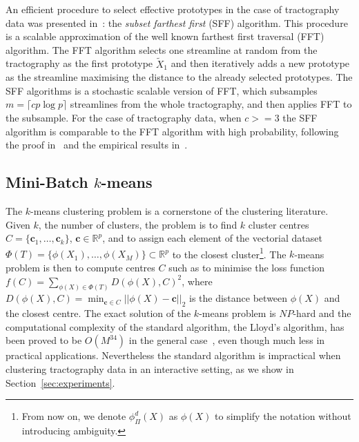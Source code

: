 An efficient procedure to select effective prototypes in the case of
tractography data was presented in~\cite{olivetti2012approximation}:
the \emph{subset farthest first} (SFF) algorithm. This procedure is a
scalable approximation of the well known farthest first traversal
(FFT) algorithm.
The FFT algorithm selects one streamline at random from the
tractography as the first prototype $\tilde{X}_1$ and then iteratively
adds a new prototype as the streamline maximising the distance to the
already selected prototypes. The SFF algorithms is a stochastic
scalable version of FFT, which subsamples $m = \lceil c p \log p
\rceil$ streamlines from the whole tractography, and then applies FFT
to the subsample. For the case of tractography data, when $c>=3$ the
SFF algorithm is comparable to the FFT algorithm with high
probability, following the proof in~\cite{turnbull2005fast} and the
empirical results in~\cite{olivetti2012approximation}.


\subsection{Mini-Batch $k$-means}
\label{sec:mbkm}
The $k$-means clustering problem is a cornerstone of the clustering
literature. Given $k$, the number of clusters, the problem is to find
$k$ cluster centres $C = \{\mathbf{c}_1,\ldots,\mathbf{c}_k\}$,
$\mathbf{c} \in \mathbb{R}^p$, and to assign each element of the
vectorial dataset $\Phi(T) = \{\phi(X_1),\ldots,\phi(X_M)\} \subset
\mathbb{R}^p$ to the closest cluster\footnote{From now on, we denote
  $\phi_{\Pi}^d(X)$ as $\phi(X)$ to simplify the notation without
  introducing ambiguity.}. The $k$-means problem is then to compute
centres $C$ such as to minimise the loss function $f(C) =
\sum_{\phi(X) \in \Phi(T)} D(\phi(X),C)^2$,
where $D(\phi(X),C) = \min_{\mathbf{c} \in C}||\phi(X) -
\mathbf{c}||_2$ is the distance between $\phi(X)$ and the closest
centre. The exact solution of the $k$-means problem is $NP$-hard and
the computational complexity of the standard algorithm, the Lloyd's
algorithm, has been proved to be $O(M^{34})$ in the general
case~\cite{arthur2009kmeans}, even though much less in practical
applications. Nevertheless the standard algorithm is impractical when
clustering tractography data in an interactive setting, as we show in
Section~\ref{sec:experiments}.

